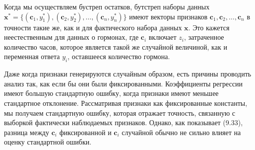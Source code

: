 Когда мы осуществляем бустреп остатков, бутстреп наборы данных $\textbf{x}^* = \{(\textbf{c}_1, y_1^*), (\textbf{c}_2, y_2^*), \ldots, (\textbf{c}_n, y_n^*)\}$ имеют векторы признаков $\textbf{c}_1, \textbf{c}_2, \ldots, \textbf{c}_n$ в точности такие же, как и для фактического набора данных $\textbf{x}$. Это кажется неестественным для данных о гормонах, где $\textbf{c}_i$ включает $z_i$, затраченное количество часов, которое является такой же случайной величиной, как и переменная ответа $y_i$, оставшееся количество гормона.

Даже когда признаки генерируются случайным образом, есть причины проводить анализ так, как если бы они были фиксированными. Коэффициенты регрессии имеют большую стандартную ошибку, когда признаки имеют меньшее стандартное отклонение. Рассматривая признаки как фиксированные константы, мы получаем стандартную ошибку, которая отражает точность, связанную с выборкой фактически наблюдаемых признаков. Однако, как показывает (9.33), разница между $\textbf{c}_i$ фиксированной и $\textbf{c}_i$ случайной обычно не сильно влияет на оценку стандартной ошибки.